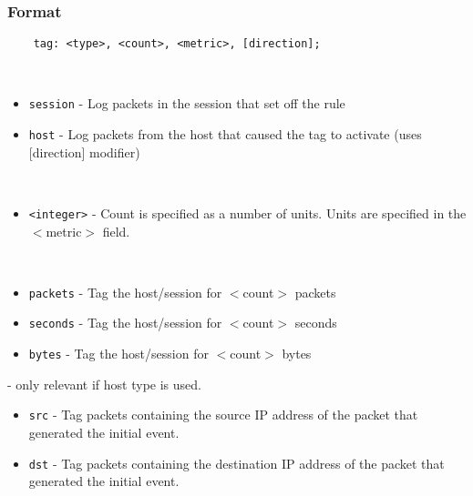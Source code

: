 \documentclass[english]{report}
\begin{document}
\subsubsection{Format}

\begin{verbatim}
    tag: <type>, <count>, <metric>, [direction];
\end{verbatim}

\begin{description}{}
\item [\texttt{type}]~

\begin{itemize}{}
\item \texttt{session} - Log packets in the session that set off the rule 

\item \texttt{host} - Log packets from the host that caused the tag to activate
(uses {[}direction{]} modifier)

\end{itemize}

\item [\texttt{count}]~
\begin{itemize}{}

\item \texttt{<integer>} - Count is specified as a number of units. Units are
specified in the $<$metric$>$ field.

\end{itemize}{}

\item [\texttt{metric}]~

\begin{itemize}{}
\item \texttt{packets} - Tag the host/session for $<$count$>$ packets 
\item \texttt{seconds} - Tag the host/session for $<$count$>$ seconds
\item \texttt{bytes}   - Tag the host/session for $<$count$>$ bytes
\end{itemize}

\item [\texttt{direction}] - only relevant if host type is used.

\begin{itemize}{}

\item \texttt{src} - Tag packets containing the source IP address of the packet
that generated the initial event.

\item \texttt{dst} - Tag packets containing the destination IP address of the
packet that generated the initial event.

\end{itemize}

\end{description}
\end{document}
